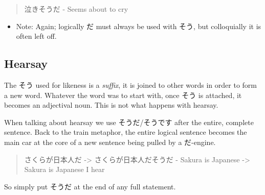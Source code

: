 \documentclass[11pt]{article}
\begin{document}
\begin{quote}
泣きそうだ - Seems about to cry
\end{quote}
\begin{itemize}
\item Note: Again; logically だ must always be used with そう, but colloquially it is often left off.
\end{itemize}

\subsection{Hearsay}
\label{sec:orgfbba152}
The そう used for likeness is a \emph{suffix}, it is joined to other words in order to form a new word. Whatever the word was to start with, once そう is attached, it becomes an adjectival noun. This is not what happens with hearsay.

When talking about hearsay we use そうだ/そうです after the entire, complete sentence. Back to the train metaphor, the entire logical sentence becomes the main car at the core of a new sentence being pulled by a だ-engine.

\begin{quote}
さくらが日本人だ -> さくらが日本人だそうだ - Sakura is Japanese -> Sakura is Japanese I hear
\end{quote}
So simply put そうだ at the end of any full statement.
\end{document}
